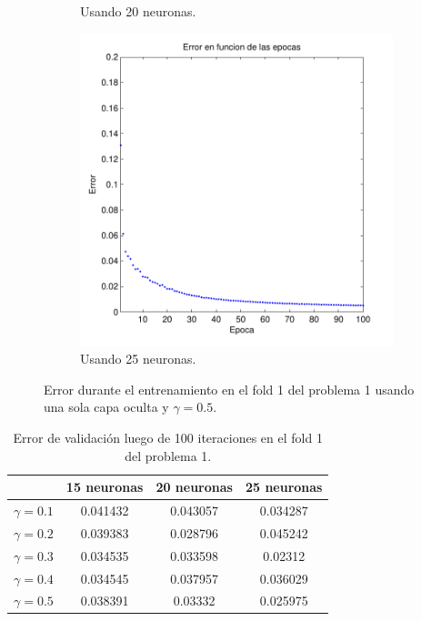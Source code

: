 \documentclass[informe.tex]{subfiles}
\begin{document}
\begin{figure}
\begin{subfigure}[b]{0.32\textwidth}
                \caption{Usando 20 neuronas.}
                \label{fig:d1-f1-05-n20}
        \end{subfigure}
        \begin{subfigure}[b]{0.32\textwidth}
                \includegraphics[width=\textwidth]{graficos/error_fold1_25_binary_100_05.pdf}
                \caption{Usando 25 neuronas.}
                \label{fig:d1-f1-05-n25}
        \end{subfigure}
        
        \caption{Error durante el entrenamiento en el fold 1 del problema 1 usando una sola capa oculta y $\gamma=0.5$.}\label{fig:p1-f1-gamma05}
    \end{figure}    
    
    \FloatBarrier
    
    \begin{table}[H]
      \begin{center}
	\begin{tabular}{|c|c|c|c|}
	\hline
	& 15 neuronas & 20 neuronas & 25 neuronas \\ 
	\hline
	$\gamma=0.1$ & 0.041432 & 0.043057 & 0.034287 \\
	\hline
	$\gamma=0.2$ & 0.039383 & 0.028796 & 0.045242 \\
	\hline
	$\gamma=0.3$ & 0.034535 & 0.033598 & 0.02312 \\
	\hline
	$\gamma=0.4$ & 0.034545 & 0.037957 & 0.036029 \\
	\hline     
	$\gamma=0.5$ & 0.038391 & 0.03332 & 0.025975 \\
	\hline      
	\end{tabular}
	\caption{Error de validación luego de 100 iteraciones en el fold 1 del problema 1.}
	\label{tab:error-d1-f1}
      \end{center}
    \end{table}
    
\end{document}
